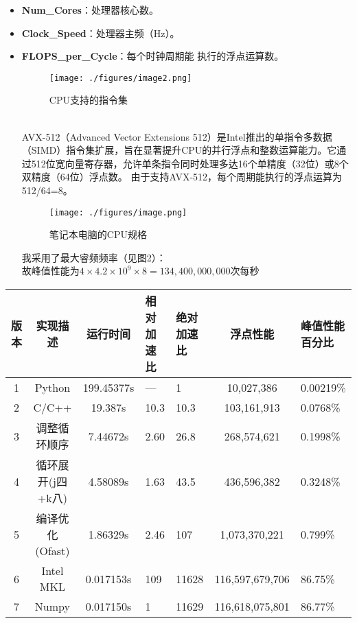 \documentclass{SYSUReport}
\begin{document}
\begin{itemize}
    \item \textbf{Num\_Cores}：处理器核心数。
    \item \textbf{Clock\_Speed}：处理器主频（Hz）。
    \item \textbf{FLOPS\_per\_Cycle}：每个时钟周期能
    执行的浮点运算数。
    \begin{figure}[htbp]
        \centering
        \texttt{[image: ./figures/image2.png]}
        \caption{CPU支持的指令集}
        \label{fig:AVX}
    \end{figure}
    \\AVX-512（Advanced Vector Extensions 512）是Intel推出的单指令多数据（SIMD）指令集扩展，旨在显著提升CPU的并行浮点和整数运算能力。它通过512位宽向量寄存器，允许单条指令同时处理多达16个单精度（32位）或8个双精度（64位）浮点数。
    由于支持AVX-512，每个周期能执行的浮点运算为512/64=8。\\
    \begin{figure}[htbp]
        \centering
        \texttt{[image: ./figures/image.png]}
        \caption{笔记本电脑的CPU规格}
        \label{fig:CPU}
    \end{figure}
    我采用了最大睿频频率（见图2）：
    \\故峰值性能为$4 × 4.2 × 10^9 \times 8=134,400,000,000$次每秒

\end{itemize}

\begin{table}[h]
    \centering
    \begin{tabular}{|c|c|c|p{1.5cm}|p{1.5cm}|c|p{2cm}|}
        \hline
        版本 & 实现描述 & 运行时间& 相对加速比 & 绝对加速比 & 浮点性能 & 峰值性能百分比 \\
        \hline
        1 & Python &199.45377s&—&1&10,027,386&0.00219\%\\ 
        \hline
        2 & C/C++ &19.387s&10.3&10.3&103,161,913&0.0768\% \\ 
        \hline
        3 & 调整循环顺序 &7.44672s&2.60&26.8&268,574,621&0.1998\% \\ 
        \hline
        4 & 循环展开(j四+k八)&4.58089s&1.63&43.5&436,596,382&0.3248\%\\ 
        \hline
        5 & 编译优化(Ofast) &1.86329s&2.46&107&1,073,370,221&0.799\%\\ 
        \hline
        6 & Intel MKL &0.017153s&109&11628&116,597,679,706&86.75\%\\ 
        \hline
        7 & Numpy &0.017150s&1&11629&116,618,075,801&86.77\%\\ 
        \hline
    \end{tabular}
\end{table}
\end{document}
